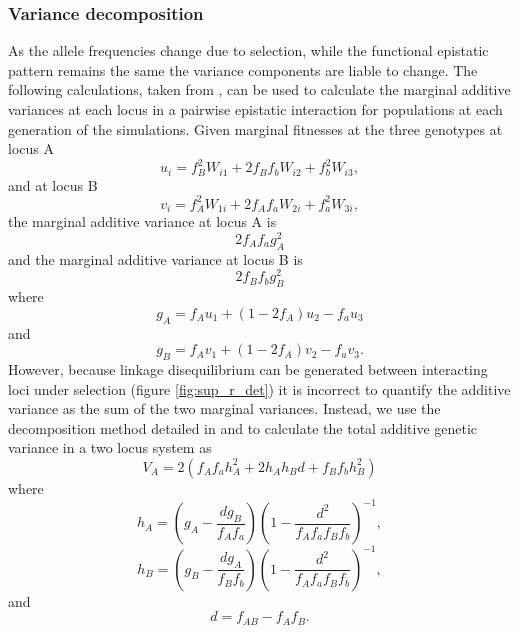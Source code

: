 \subsubsection{Variance decomposition}

As the allele frequencies change due to selection, while the functional epistatic pattern remains the same the variance components are liable to change. The following calculations, taken from \citet{Ewens2004}, can be used to calculate the marginal additive variances at each locus in a pairwise epistatic interaction for populations at each generation of the simulations. Given marginal fitnesses at the three genotypes at locus A
\begin{equation}
u_i = f_B^2W_{i1} + 2f_Bf_bW_{i2} + f_b^2W_{i3},
\end{equation}
and at locus B
\begin{equation}
v_i = f_A^2W_{1i}+2f_Af_aW_{2i} + f_a^2W_{3i},
\end{equation}
the marginal additive variance at locus A is
\begin{equation}
2f_{A}f_{a}g^{2}_{A}
\end{equation}
and the marginal additive variance at locus B is
\begin{equation}
2f_{B}f_{b}g^{2}_{B}
\end{equation}
where
\begin{equation}
g_A = f_Au_1 + (1-2f_A)u_2 - f_au_3
\end{equation}
and
\begin{equation}
g_B = f_Av_1 + (1-2f_A)v_2 - f_av_3.
\end{equation}
However, because linkage disequilibrium can be generated between interacting loci under selection (figure \ref{fig:sup_r_det}) it is incorrect to quantify the additive variance as the sum of the two marginal variances. Instead, we use the decomposition method detailed in \citet{Kojima1961} and \citet{Kimura1965} to calculate the total additive genetic variance in a two locus system as
\begin{equation}
V_A = 2\left ( f_Af_ah_A^2 + 2h_Ah_Bd + f_Bf_bh_B^2 \right )
\end{equation}
where
\begin{equation}
h_A = \left ( g_A - \frac{dg_B}{f_Af_a} \right )\left ( 1 - \frac{d^2}{f_Af_af_Bf_b} \right )^{-1},
\end{equation}
\begin{equation}
h_B = \left ( g_B - \frac{dg_A}{f_Bf_b} \right )\left ( 1 - \frac{d^2}{f_Af_af_Bf_b} \right )^{-1},
\end{equation}
and
\begin{equation}
d = f_{AB} - f_Af_B.
\end{equation}

